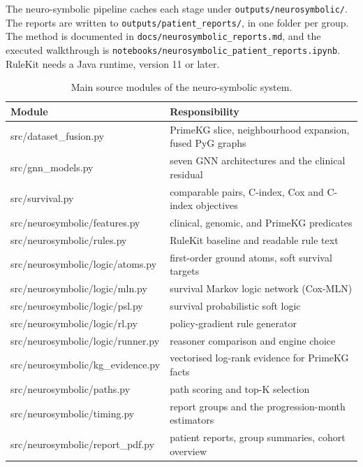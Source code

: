 \documentclass{mnnit}
\begin{document}
The neuro-symbolic pipeline caches each stage under \texttt{outputs/neurosymbolic/}. The reports are written to
\texttt{outputs/patient\_reports/}, in one folder per group. The method is documented in
\texttt{docs/neurosymbolic\_reports.md}, and the executed walkthrough is
\texttt{notebooks/neurosymbolic\_patient\_reports.ipynb}. RuleKit needs a Java runtime, version 11 or later.

\begin{table}[htbp]
  \centering
  \small\setlength{\tabcolsep}{4pt}
  \caption{Main source modules of the neuro-symbolic system.}
  \label{tab:modules}
  \begin{tabular}{>{\ttfamily}l p{7.4cm}}
    \toprule
    \normalfont Module & Responsibility \\
    \midrule
    src/dataset\_fusion.py & PrimeKG slice, neighbourhood expansion, fused PyG graphs \\
    src/gnn\_models.py & seven GNN architectures and the clinical residual \\
    src/survival.py & comparable pairs, C-index, Cox and C-index objectives \\
    src/neurosymbolic/features.py & clinical, genomic, and PrimeKG predicates \\
    src/neurosymbolic/rules.py & RuleKit baseline and readable rule text \\
    src/neurosymbolic/logic/atoms.py & first-order ground atoms, soft survival targets \\
    src/neurosymbolic/logic/mln.py & survival Markov logic network (Cox-MLN) \\
    src/neurosymbolic/logic/psl.py & survival probabilistic soft logic \\
    src/neurosymbolic/logic/rl.py & policy-gradient rule generator \\
    src/neurosymbolic/logic/runner.py & reasoner comparison and engine choice \\
    src/neurosymbolic/kg\_evidence.py & vectorised log-rank evidence for PrimeKG facts \\
    src/neurosymbolic/paths.py & path scoring and top-K selection \\
    src/neurosymbolic/timing.py & report groups and the progression-month estimators \\
    src/neurosymbolic/report\_pdf.py & patient reports, group summaries, cohort overview \\
    \bottomrule
  \end{tabular}
\end{table}
\end{document}
